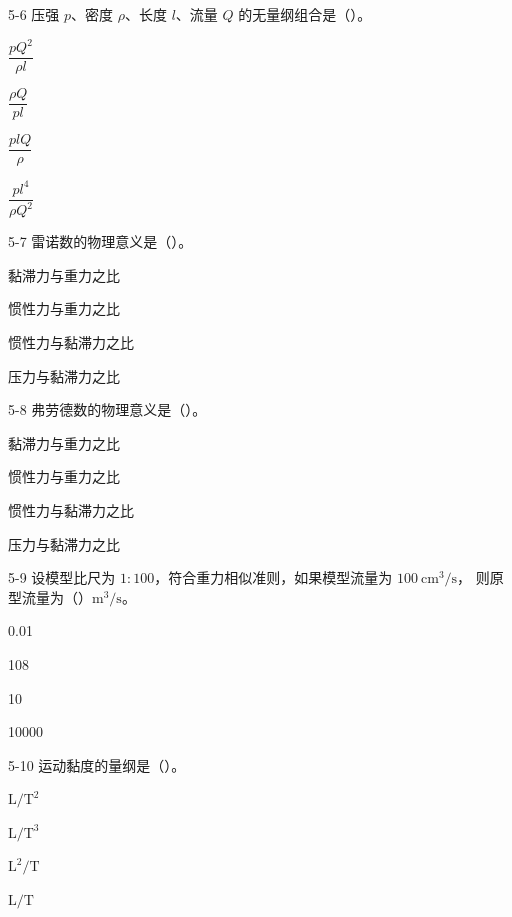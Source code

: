 \begin{ti}
\item[5-6] 压强 $p$、密度 $\rho$、长度 $l$、流量 $Q$ 的无量纲组合是（\quad）。
\begin{choices}
\item $\dfrac{pQ^2}{\rho l}$
\item $\dfrac{\rho Q}{pl}$
\item $\dfrac{plQ}{\rho}$
\item $\dfrac{pl^4}{\rho Q^2}$
\end{choices}

\item[5-7] 雷诺数的物理意义是（\quad）。
\begin{choices}
\item 黏滞力与重力之比
\item 惯性力与重力之比
\item 惯性力与黏滞力之比
\item 压力与黏滞力之比
\end{choices}

\item[5-8] 弗劳德数的物理意义是（\quad）。
\begin{choices}
\item 黏滞力与重力之比
\item 惯性力与重力之比
\item 惯性力与黏滞力之比
\item 压力与黏滞力之比
\end{choices}

\item[5-9] 设模型比尺为 $1:100$，符合重力相似准则，如果模型流量为 $100\ \mathrm{cm^3/s}$，
则原型流量为（\quad）$\mathrm{m^3/s}$。
\begin{choices}
\item 0.01
\item 108
\item 10
\item 10000
\end{choices}

\item[5-10] 运动黏度的量纲是（\quad）。
\begin{choices}
\item $\mathrm{L}/\mathrm{T}^2$
\item $\mathrm{L}/\mathrm{T}^3$
\item $\mathrm{L}^2/\mathrm{T}$
\item $\mathrm{L}/\mathrm{T}$
\end{choices}

\end{ti}

